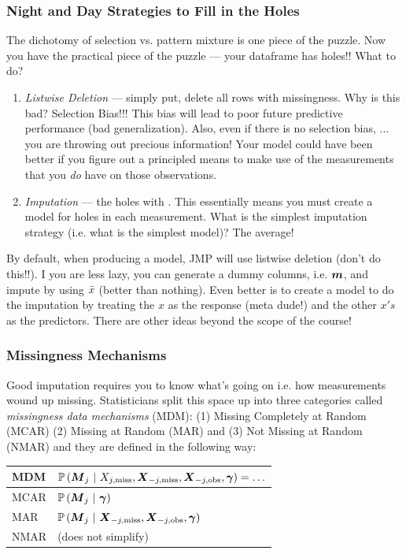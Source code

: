 \documentclass[handout]{beamer}
\begin{document}
\begin{frame}\frametitle{Night and Day Strategies to Fill in the Holes}
\footnotesize
The dichotomy of selection vs. pattern mixture is one piece of the puzzle. Now you have the practical piece of the puzzle --- your dataframe has holes!! What to do?\pause

\begin{enumerate} \footnotesize
\item \emph{Listwise Deletion} \pause --- simply put, delete all rows with missingness. Why is this bad? \pause Selection Bias!!! This bias will lead to poor future predictive performance (bad generalization). Also, even if there is no selection bias, ... \pause you are throwing out precious information! Your model could have been better if you figure out a principled means to make use of the measurements that you \textit{do} have on those observations.
\item \emph{Imputation} \pause ---  the holes with . \pause This essentially means you must create a model for holes in each measurement. What is the simplest imputation strategy (i.e. what is the simplest model)? \pause The average! \pause
\end{enumerate}

By default, when producing a model, JMP will use listwise deletion (don't do this!!). \pause I you are less lazy, you can generate a dummy columns, i.e. $\boldsymbol{m}$, and impute by using $\bar{x}$ (better than nothing). Even better is to create a model to do the imputation by treating the $x$ as the response (meta dude!) and the other $x's$ as the predictors. There are other ideas beyond the scope of the course!

\end{frame}

\begin{frame}\frametitle{Missingness Mechanisms}

Good imputation requires you to know what's going on i.e. how measurements wound up missing. Statisticians split this space up into three categories called \emph{missingness data mechanisms} (MDM): \pause (1) Missing Completely at Random (MCAR) \pause (2) Missing at Random (MAR) and \pause (3) Not Missing at Random (NMAR) and they are defined in the following way:\pause
	
	
\begin{table}[htp]
\centering
\begin{tabular}{l|l}
MDM & $\mathbb{P}\left(\boldsymbol{M}_j~|~X_{j,\text{miss}}, \boldsymbol{X}_{-j,\text{miss}}, \boldsymbol{X}_{-j,\text{obs}}, \boldsymbol{\gamma}\right) = \ldots$ \\ \hline
MCAR & $\mathbb{P}\left(\boldsymbol{M}_j~|~\boldsymbol{\gamma}\right)$ \\ 
MAR & $\mathbb{P}\left(\boldsymbol{M}_j~|~\boldsymbol{X}_{-j,\text{miss}}, \boldsymbol{X}_{-j,\text{obs}}, \boldsymbol{\gamma}\right)$ \\ 
NMAR & (does not simplify)
\end{tabular}
\end{table}
\end{frame}
\end{document}
